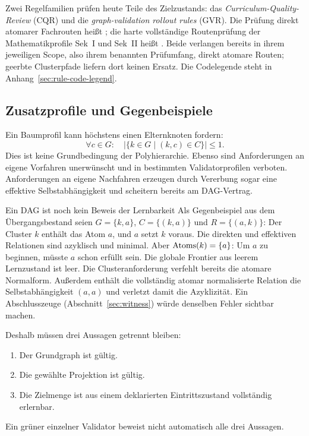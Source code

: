 Zwei Regelfamilien prüfen heute Teile des Zielzustands: das
\emph{Curriculum-Quality-Review} (CQR) und die \emph{graph-validation
rollout rules} (GVR). Die Prüfung direkt atomarer Fachrouten heißt
; die harte vollständige Routenprüfung der Mathematikprofile
Sek~I und Sek~II heißt .
Beide verlangen bereits in ihrem jeweiligen Scope, also ihrem benannten
Prüfumfang, direkt atomare Routen; geerbte Clusterpfade liefern dort keinen
Ersatz. Die Codelegende steht in Anhang~\ref{sec:rule-code-legend}.

\subsection{Zusatzprofile und Gegenbeispiele}
Ein Baumprofil kann höchstens einen Elternknoten fordern:
\[
 \forall c\in G:\quad
 \bigl|\{k\in G\mid(k,c)\in C\}\bigr|\leq1.
\]
Dies ist keine Grundbedingung der Polyhierarchie. Ebenso sind Anforderungen
an eigene Vorfahren unerwünscht und in bestimmten Validatorprofilen
verboten. Anforderungen an eigene Nachfahren erzeugen durch Vererbung sogar
eine effektive Selbstabhängigkeit und scheitern bereits am DAG-Vertrag.

\begin{principle}{Ein DAG ist noch kein Beweis der Lernbarkeit}
Als Gegenbeispiel aus dem Übergangsbestand seien $G=\{k,a\}$,
$C=\{(k,a)\}$ und $R=\{(a,k)\}$: Der Cluster $k$ enthält das Atom $a$, und
$a$ setzt $k$ voraus.
Die direkten und effektiven Relationen sind azyklisch und minimal.
Aber $\operatorname{Atoms}(k)=\{a\}$: Um $a$ zu beginnen, müsste $a$ schon erfüllt sein.
Die globale Frontier aus leerem Lernzustand ist leer.
Die Clusteranforderung verfehlt bereits die atomare Normalform. Außerdem
enthält die vollständig atomar normalisierte Relation die Selbstabhängigkeit
$(a,a)$ und verletzt damit die Azyklizität. Ein Abschlusszeuge
(Abschnitt~\ref{sec:witness}) würde denselben Fehler sichtbar machen.
\end{principle}

Deshalb müssen drei Aussagen getrennt bleiben:
\begin{enumerate}
\item Der Grundgraph ist gültig.
\item Die gewählte Projektion ist gültig.
\item Die Zielmenge ist aus einem deklarierten Eintrittszustand vollständig
 erlernbar.
\end{enumerate}
Ein grüner einzelner Validator beweist nicht automatisch alle drei Aussagen.

